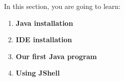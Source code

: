 \setlength{\columnsep}{3pt}
\begin{flushleft}
	\bigskip
	\bigskip
	\begin{tcolorbox}[breakable,notitle,boxrule=1pt,colback=black,colframe=black]
		\color{white}
		\bigskip
		In this section, you are going to learn:
		\begin{enumerate}
			\item \textbf{Java installation}
			\item \textbf{IDE installation}
			\item \textbf{Our first Java program}
			\item \textbf{Using JShell}
		\end{enumerate}	
	\end{tcolorbox}

\end{flushleft}
\newpage
